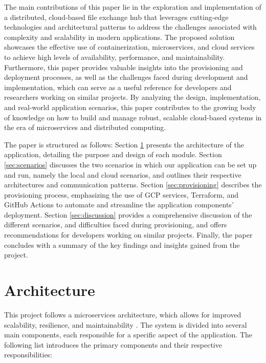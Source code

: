 \documentclass[a4paper,fleqn]{cas-dc}
\begin{document}
The main contributions of this paper lie in the exploration and implementation of a distributed, cloud-based file exchange hub that leverages cutting-edge technologies and architectural patterns to address the challenges associated with complexity and scalability in modern applications. The proposed solution showcases the effective use of containerization, microservices, and cloud services to achieve high levels of availability, performance, and maintainability. Furthermore, this paper provides valuable insights into the provisioning and deployment processes, as well as the challenges faced during development and implementation, which can serve as a useful reference for developers and researchers working on similar projects. By analyzing the design, implementation, and real-world application scenarios, this paper contributes to the growing body of knowledge on how to build and manage robust, scalable cloud-based systems in the era of microservices and distributed computing.

The paper is structured as follows: Section \ref{sec:architecture} presents the architecture of the application, detailing the purpose and design of each module. Section \ref{sec:scenarios} discusses the two scenarios in which our application can be set up and run, namely the local and cloud scenarios, and outlines their respective architectures and communication patterns. Section \ref{sec:provisioning} describes the provisioning process, emphasizing the use of GCP services, Terraform, and GitHub Actions to automate and streamline the application components' deployment. Section \ref{sec:discussion} provides a comprehensive discussion of the different scenarios, and difficulties faced during provisioning, and offers recommendations for developers working on similar projects. Finally, the paper concludes with a summary of the key findings and insights gained from the project.

\section{Architecture}\label{sec:architecture}

This project follows a microservices architecture, which allows for improved scalability, resilience, and maintainability \cite{Taibi2017}. The system is divided into several main components, each responsible for a specific aspect of the application. The following list introduces the primary components and their respective responsibilities:
\end{document}
